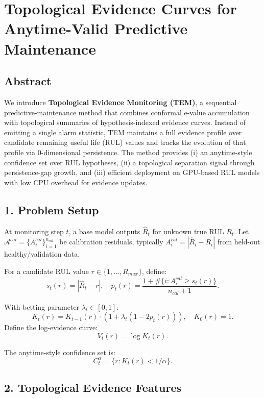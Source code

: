 \documentclass[
]{article}
\author{}
\date{}
\begin{document}
{
\setcounter{tocdepth}{3}
\tableofcontents
}
\section{Topological Evidence Curves for Anytime-Valid Predictive
Maintenance}\label{topological-evidence-curves-for-anytime-valid-predictive-maintenance}

\subsection{Abstract}\label{abstract}

We introduce \textbf{Topological Evidence Monitoring (TEM)}, a
sequential predictive-maintenance method that combines conformal e-value
accumulation with topological summaries of hypothesis-indexed evidence
curves. Instead of emitting a single alarm statistic, TEM maintains a
full evidence profile over candidate remaining useful life (RUL) values
and tracks the evolution of that profile via 0-dimensional persistence.
The method provides (i) an anytime-style confidence set over RUL
hypotheses, (ii) a topological separation signal through persistence-gap
growth, and (iii) efficient deployment on GPU-based RUL models with low
CPU overhead for evidence updates.

\subsection{1. Problem Setup}\label{problem-setup}

At monitoring step \(t\), a base model outputs \(\hat R_t\) for unknown
true RUL \(R_t\). Let
\(\mathcal{A}^{cal}=\{A_i^{cal}\}_{i=1}^{n_{cal}}\) be calibration
residuals, typically \(A_i^{cal}=|\hat R_i-R_i|\) from held-out
healthy/validation data.

For a candidate RUL value \(r \in \{1,\dots,R_{max}\}\), define: \[
s_t(r)=|\hat R_t-r|,\quad
p_t(r)=\frac{1+\#\{i:A_i^{cal}\ge s_t(r)\}}{n_{cal}+1}.
\]

With betting parameter \(\lambda_t\in[0,1]\): \[
K_t(r)=K_{t-1}(r)\cdot\left(1+\lambda_t(1-2p_t(r))\right),\quad K_0(r)=1.
\] Define the log-evidence curve: \[
V_t(r)=\log K_t(r).
\]

The anytime-style confidence set is: \[
C_t^\alpha=\{r:K_t(r)<1/\alpha\}.
\]

\subsection{2. Topological Evidence
Features}\label{topological-evidence-features}
\end{document}
